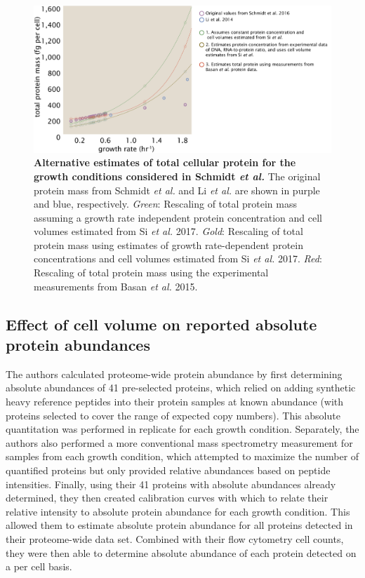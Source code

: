 \begin{figure}
		\centering
    \includegraphics[width=1\textwidth]{SI_figs/schmidt_protein_corrections.pdf}
  \caption{{\bf Alternative estimates of total cellular protein for the growth conditions
    considered in Schmidt \textit{et al.}} The original protein mass from
    Schmidt \textit{et al.} and Li \textit{et al.} are shown in purple and blue,
    respectively. \textit{Green}: Rescaling of total protein mass assuming a
    growth rate independent protein concentration and cell volumes estimated
    from Si \textit{et al.} 2017. \textit{Gold}:  Rescaling of total protein
    mass using estimates of growth rate-dependent protein concentrations and
    cell volumes estimated from Si \textit{et al.} 2017. \textit{Red}: Rescaling
    of total protein mass using the experimental measurements from Basan
    \textit{et al.} 2015.
	 	}
  \label{fig:schmidt_adjustment_summary}
\end{figure}

\subsection{Effect of cell volume on reported absolute protein abundances}

The authors calculated proteome-wide  protein abundance by first determining
absolute abundances of 41 pre-selected proteins, which relied on adding
synthetic heavy reference peptides into their protein samples at known abundance
(with proteins selected to cover the range of expected copy numbers).  This
absolute quantitation was performed in replicate for each growth condition.
Separately, the authors also performed a more conventional mass spectrometry
measurement for samples from each growth condition, which attempted to maximize
the number of quantified proteins but only provided relative abundances based on
peptide intensities. Finally, using their 41 proteins with absolute abundances
already determined, they then created calibration curves with which to relate
their relative intensity to absolute protein abundance for each growth
condition.  This allowed them to estimate absolute protein abundance for all
proteins detected in their proteome-wide data set. Combined with their flow
cytometry cell counts, they were then able to determine absolute abundance of
each protein detected on a per cell basis.

